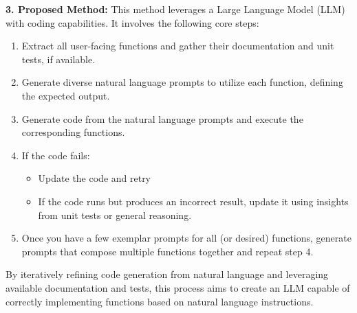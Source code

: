 \begin{tcolorbox}[colback=blue!5!white,colframe=blue!75!black,title=\textbf{Autoprompting: Generate Diverse Few-Shot Examples for Any Application (Part 1)}]
{\textbf{3. Proposed Method:} This method leverages a Large Language Model (LLM) with coding capabilities. It involves the following core steps:
\begin{enumerate}
    \item Extract all user-facing functions and gather their documentation and unit tests, if available.
    \item Generate diverse natural language prompts to utilize each function, defining the expected output.
    \item Generate code from the natural language prompts and execute the corresponding functions.
    \item If the code fails:
    \begin{itemize}
        \item Update the code and retry
        \item If the code runs but produces an incorrect result, update it using insights from unit tests or general reasoning.
    \end{itemize}
    \item Once you have a few exemplar prompts for all (or desired) functions, generate prompts that compose multiple functions together and repeat step 4.
\end{enumerate}
By iteratively refining code generation from natural language and leveraging available documentation and tests, this process aims to create an LLM capable of correctly implementing functions based on natural language instructions.
\\

}
\end{tcolorbox}
